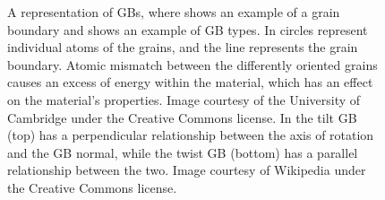 \documentclass[12pt]{report}
\begin{document}
\begin{figure}[ht!]
\vspace{-20pt}
 \centering
 
 \quad
 \quad
 \caption[Examples and types of grain boundaries.]{\label{gbs} A representation of GBs, where \protect{} shows an example of a grain boundary and \protect{} shows an example of GB types.  In \protect{} circles represent individual atoms of the grains, and the line represents the grain boundary.  Atomic mismatch between the differently oriented grains causes an excess of energy within the material, which has an effect on the material's properties.  Image courtesy of the University of Cambridge under the Creative Commons license. In \protect{} the tilt GB (top) has a perpendicular relationship between the axis of rotation and the GB normal, while the twist GB (bottom) has a parallel relationship between the two.  Image courtesy of Wikipedia under the Creative Commons license.}
\end{figure}
\end{document}
